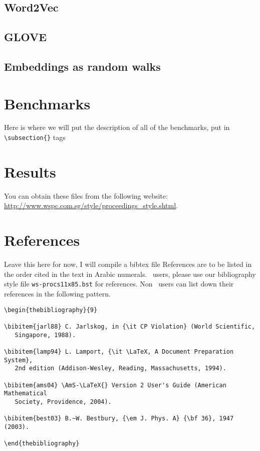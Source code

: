 \documentclass{ws-procs11x85}
\begin{document}
 \subsection{Word2Vec}
 
 \subsection{GLOVE} 
 
 \subsection{Embeddings as random walks}

\section{Benchmarks}
Here is where we will put the description of all of the benchmarks, put in \verb|\subsection{}| tags

\section{Results}
You can obtain these files from the following website:
\url{http://www.wspc.com.sg/style/proceedings_style.shtml}.




\section{References}
Leave this here for now, I will compile a bibtex file
References are to be listed in the order cited in the text in Arabic
numerals. \btex\ users, please use our bibliography style file
\verb|ws-procs11x85.bst| for references. Non \btex\ users can list
down their references in the following pattern.

\begin{verbatim}
\begin{thebibliography}{9}

\bibitem{jarl88} C. Jarlskog, in {\it CP Violation} (World Scientific,
   Singapore, 1988).

\bibitem{lamp94} L. Lamport, {\it \LaTeX, A Document Preparation System},
   2nd edition (Addison-Wesley, Reading, Massachusetts, 1994).

\bibitem{ams04} \AmS-\LaTeX{} Version 2 User's Guide (American Mathematical
   Society, Providence, 2004).

\bibitem{best03} B.~W. Bestbury, {\em J. Phys. A} {\bf 36}, 1947 (2003).

\end{thebibliography}
\end{verbatim}
\end{document}
